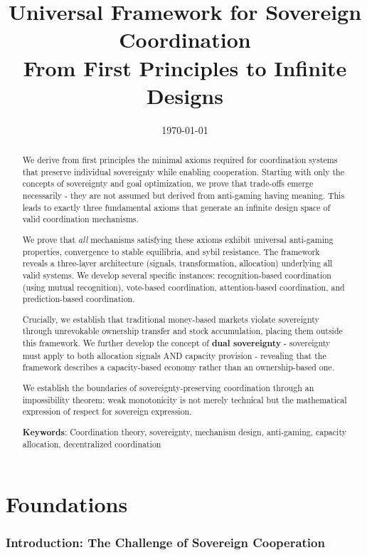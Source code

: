\documentclass[11pt,a4paper]{article}
\title{\textbf{Universal Framework for Sovereign Coordination}\\
\large From First Principles to Infinite Designs}
\author{}
\date{\today}
\theoremstyle{definition}
\theoremstyle{remark}
\begin{document}
\maketitle

\begin{abstract}
We derive from first principles the minimal axioms required for coordination systems that preserve individual sovereignty while enabling cooperation. Starting with only the concepts of sovereignty and goal optimization, we prove that trade-offs emerge necessarily - they are not assumed but derived from anti-gaming having meaning. This leads to exactly three fundamental axioms that generate an infinite design space of valid coordination mechanisms. 

We prove that \textit{all} mechanisms satisfying these axioms exhibit universal anti-gaming properties, convergence to stable equilibria, and sybil resistance. The framework reveals a three-layer architecture (signals, transformation, allocation) underlying all valid systems. We develop several specific instances: recognition-based coordination (using mutual recognition), vote-based coordination, attention-based coordination, and prediction-based coordination.

Crucially, we establish that traditional money-based markets violate sovereignty through unrevokable ownership transfer and stock accumulation, placing them outside this framework. We further develop the concept of \textbf{dual sovereignty} - sovereignty must apply to both allocation signals AND capacity provision - revealing that the framework describes a capacity-based economy rather than an ownership-based one. 

We establish the boundaries of sovereignty-preserving coordination through an impossibility theorem: weak monotonicity is not merely technical but the mathematical expression of respect for sovereign expression.

\medskip

\noindent\textbf{Keywords}: Coordination theory, sovereignty, mechanism design, anti-gaming, capacity allocation, decentralized coordination
\end{abstract}

\tableofcontents
\newpage

\part{Foundations}

\section{Introduction: The Challenge of Sovereign Cooperation}
\end{document}
